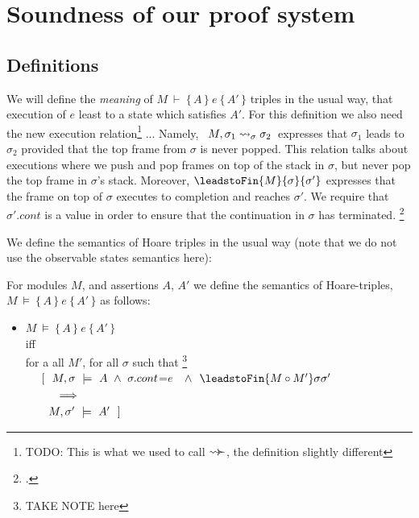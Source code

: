 


\section{Soundness of our proof system}

\subsection{Definitions}

We will define the {\emph {meaning}} of  $M\ \vdash\  \{\, A \,  \}\ e\  \{\, A' \, \}$ triples in the usual way, \ie that execution of $e$ least to a state which satisfies $A'$. For this definition we also need the new execution relation\footnote{TODO: This is what we used to call $\leadsto\!\!\succ$, the definition slightly different} ...
Namely, \ $M, \sigma_1 \leadsto_{\sigma} \sigma_2$\  expresses that $\sigma_1$ leads to $\sigma_2$ provided
 that the top frame from $\sigma$ is never popped. This relation talks about executions where we push and pop frames on top of the stack in $\sigma$, but never pop the top frame in $\sigma$'s stack. Moreover, $\leadstoFin {M} {\sigma} {\sigma'}$  expresses that the frame on top of $\sigma$ executes to completion and reaches $\sigma'$.
We require that $\sigma'.cont$ is a value in order to ensure that the continuation in $\sigma$ has terminated. \footnote{ .}
 

We define the semantics of Hoare triples in the usual way (note that we do not use the observable states semantics here): 

\begin{definition}

 
For modules $M$, and assertions $A$, $A'$   we define the semantics of Hoare-triples, 
 $M\ \models\  \{\, A \,  \}\ e\  \{\, A' \, \}$ as follows:
\begin{itemize}
\item
$M\ \models\  \{\, A \,  \}\ e\  \{\, A' \, \}$ \\
iff\\
 for a all $M'$, for all $\sigma$ such that \footnote{TAKE NOTE here} \\
$\strut ~ ~ ~ ~ [ \ \ M,\sigma \ \models \ A \ \wedge\  
 \sigma.cont$=$e$ $\ \ \wedge\  \ \leadstoFin  {M\circ M'} \sigma {\sigma'}$
 \\
$\strut ~ ~ ~ ~ \ \  \ \ \Longrightarrow$ \\
$\strut ~ ~ ~ ~ \ \ M,\sigma' \ \models \ A'\ \ ]$
\end{itemize}
\end{definition}
 

